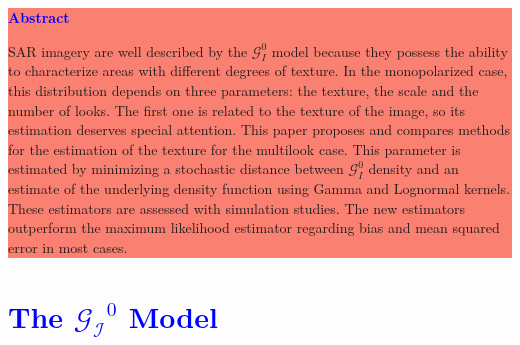 \documentclass[a0,portrait]{a0poster}
\begin{document}
\setlength{\columnsep}{1cm}
\begin{multicols}{3}

\noindent
\colorbox{salmon}{
  \begin{minipage}[t]{.96\linewidth}
    \vspace{.2cm}
    \centerline{\Large \textcolor{blue}{\textbf{Abstract}}}
    \vspace{.2cm}

SAR imagery are well described by the $\mathcal G_I^0$ model because they possess the ability to characterize areas with different degrees of texture. 
In the monopolarized case, this distribution depends on three parameters: the texture, the scale and the number of looks. The first one is related to the texture of the image, so its estimation deserves special attention.
This paper proposes and compares methods for the estimation of the texture for the multilook case. 
This parameter is estimated by minimizing a stochastic distance between $\mathcal G_I^0$ density and an estimate of the underlying density function using Gamma and Lognormal kernels. These estimators are assessed with simulation studies. 
The new estimators outperform the maximum likelihood estimator regarding bias and mean squared error in most cases.
  \end{minipage}
}

    
\section*{\textcolor{blue}{The $\mathcal{G_I}^0$ Model}}



\end{multicols}
\end{document}
